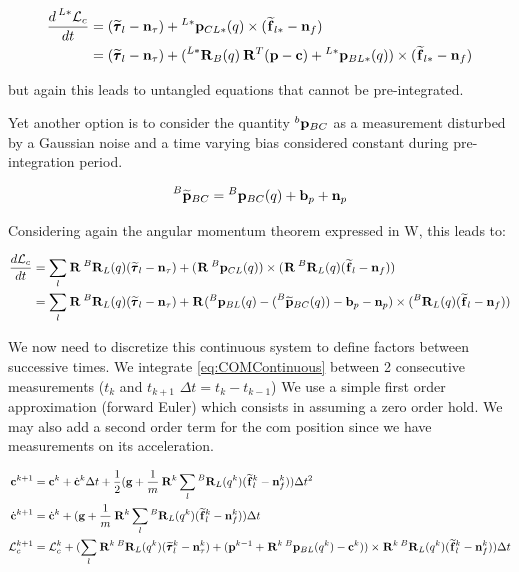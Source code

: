 \documentclass[11pt]{article}
\newcommand{\Rot}[2]{\prescript{#1}{}{\bfR}_{#2}}
\newcommand{\noise}{\bfn}
\newcommand{\posi}[2]{\prescript{#1}{}{\bfp}_{#2}}
\newcommand{\posim}[2]{\prescript{#1}{}{\widetilde{\bfp}}_{#2}}
\newcommand{\forcem}[2]{\prescript{#1}{}{\widetilde{\bff}}_{#2}}
\newcommand{\torquem}[2]{\prescript{#1}{}{\widetilde{\pmb{\tau}}}_{#2}}
\newcommand{\AM}{\mathcal{L}}
\newcommand{\COM}{\bfc}
\begin{document}
\begin{equation}
\begin{split}
    \frac{d \prescript{L*}{}{\AM}_c}{dt} &=
    (\torquem{}{l} - \noise_{\tau}) + \posi{L*}{CL*}(q) \times (\forcem{}{l*} - \noise_f)
    \\
    &= (\torquem{}{l} - \noise_{\tau}) + (\Rot{L*}{B}(q)\Rot{}{}^T(\bfp - \COM) + \posi{L*}{BL*}(q)) \times (\forcem{}{l*} - \noise_f)
\end{split}
\end{equation}
 
but again this leads to untangled equations that cannot be pre-integrated.

Yet another option is to consider the quantity $\posi{b}{BC}$  as a measurement disturbed by a Gaussian noise and a time varying bias considered constant during pre-integration period. 
 
\begin{equation}
\posim{B}{BC} = \posi{B}{BC}(q) + \bfb_{p} + \noise_p 
\end{equation}
 
Considering again the angular momentum theorem expressed in W, this leads to:
 
 
\begin{equation}
\begin{split}
    \frac{d\AM_c}{dt} &= \sum_l \Rot{}{}\Rot{B}{L}(q)(\torquem{}{l} - \noise_{\tau}) + (\Rot{}{} \posi{B}{CL}(q)) \times (\Rot{}{}\Rot{B}{L}(q)(\forcem{}{l} - \noise_f))
\\
&= \sum_l \Rot{}{}\Rot{B}{L}(q)(\torquem{}{l} - \noise_{\tau}) + \Rot{}{}( \posi{B}{BL}(q) - (\posim{B}{BC}(q)) -  \bfb_{p} - \noise_p) \times (\Rot{B}{L}(q)(\forcem{}{l} - \noise_f))
\end{split}
\end{equation}

We now need to discretize this continuous system to define factors between successive times. We integrate \ref{eq:COMContinuous} between 2 consecutive measurements ($t_k$ and $t_{k+1}$ $\Delta t = t_{k} - t_{k-1}$)  We use a simple first order approximation (forward Euler) which consists in assuming a zero order hold. We may also add a second order term for the com position since we have measurements on its acceleration.

\begin{equation}
\begin{split}
\COM^{k+1} &= \COM^{k} + \dot{\COM}^{k} \Delta t 
+ \dfrac{1}{2}(\bfg + \frac{1}{m} \Rot{}{}^{k} \sum_l \Rot{B}{L}(q^{k}) (\forcem{}{l}^{k} - \noise_f^{k})) \Delta t^2
\\
\dot{\COM}^{k+1}&= \dot{\COM}^{k} + (\bfg + \frac{1}{m} \Rot{}{}^{k} \sum_l \Rot{B}{L}(q^{k}) (\forcem{}{l}^{k} - \noise_f^{k})) \Delta t 
\\
\AM_c^{k+1} &= \AM_c^{k} +  ( 
\sum_l \Rot{}{}^{k}\Rot{B}{L}(q^{k})(\torquem{}{l}^{k} - \noise_{\tau}^{k}) + (\bfp^{k-1} +
\Rot{}{}^{k}\posi{B}{BL}(q^{k}) - \COM^{k})) \times \Rot{}{}^{k}\Rot{B}{L}(q^{k})(\forcem{}{l}^{k} - \noise_f^{k}) 
) \Delta t
\end{split}
\label{eq:COMDiscrete}
\end{equation}
\end{document}
